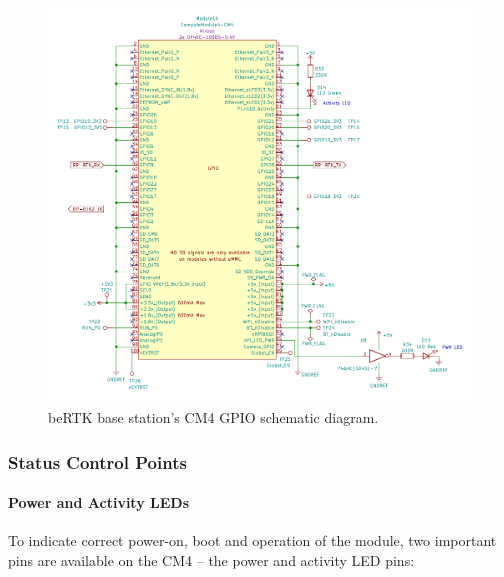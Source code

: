 \begin{figure}[h]
	\centering
	\includegraphics[width=1.0\textwidth]{Chapters/Figures/chapter3/CM4_GPIO.pdf}
	\caption{beRTK\textsuperscript{\textregistered} base station's CM4 GPIO schematic diagram.}
	\label{fig:CM4_GPIO_circuit}
\end{figure}


\subsubsection{Status Control Points}\label{sec:3223_CM4_CTRL_POINTS}

\paragraph{Power and Activity LEDs}	To indicate correct power-on, boot and operation of the module, two important pins are available on the CM4 -- the power and activity LED pins:

